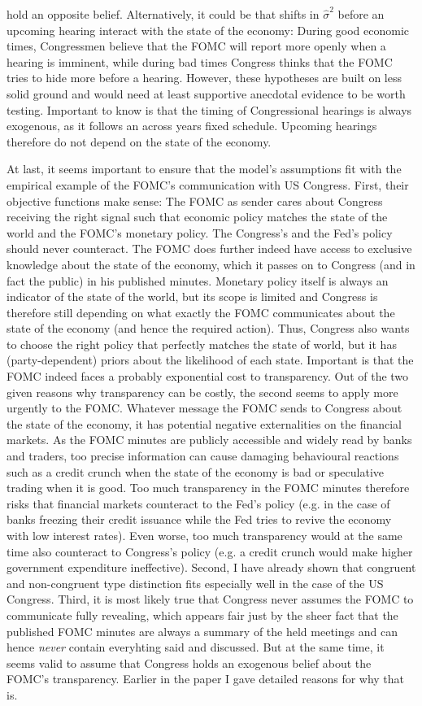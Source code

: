 \documentclass[paper=a4,12pt,DIV=11,twoside=false]{scrartcl}
\begin{document}
hold an opposite belief. Alternatively, it could be that shifts in $\hat{\sigma}^2$ before an upcoming hearing interact with the state of the economy: During good economic times, Congressmen believe that the FOMC will report more openly when a hearing is imminent, while during bad times Congress thinks that the FOMC tries to hide more before a hearing. However, these hypotheses are built on less solid ground and would need at least supportive anecdotal evidence to be worth testing. Important to know is that the timing of Congressional hearings is always exogenous, as it follows an across years fixed schedule. Upcoming hearings therefore do not depend on the state of the economy. 

\noindent At last, it seems important to ensure that the model's assumptions fit with the empirical example of the FOMC's communication with US Congress. First, their objective functions make sense: The FOMC as sender cares about Congress receiving the right signal such that economic policy matches the state of the world and the FOMC's monetary policy. The Congress's and the Fed's policy should never counteract. The FOMC does further indeed have access to exclusive knowledge about the state of the economy, which it passes on to Congress (and in fact the public) in his published minutes. Monetary policy itself is always an indicator of the state of the world, but its scope is limited and Congress is therefore still depending on what exactly the FOMC communicates about the state of the economy (and hence the required action). Thus, Congress also wants to choose the right policy that perfectly matches the state of world, but it has (party-dependent) priors about the likelihood of each state. Important is that the FOMC indeed faces a probably exponential cost to transparency. Out of the two given reasons why transparency can be costly, the second seems to apply more urgently to the FOMC. Whatever message the FOMC sends to Congress about the state of the economy, it has potential negative externalities on the financial markets. As the FOMC minutes are publicly accessible and widely read by banks and traders, too precise information can cause damaging behavioural reactions such as a credit crunch when the state of the economy is bad or speculative trading when it is good. Too much transparency in the FOMC minutes therefore risks that financial markets counteract to the Fed's policy (e.g. in the case of banks freezing their credit issuance while the Fed tries to revive the economy with low interest rates). Even worse, too much transparency would at the same time also counteract to Congress's policy (e.g. a credit crunch would make higher government expenditure ineffective). Second, I have already shown that congruent and non-congruent type distinction fits especially well in the case of the US Congress. Third,   it is most likely true that Congress never assumes the FOMC to communicate fully revealing, which appears fair just by the sheer fact that the published FOMC minutes are always a summary of the held meetings and can hence \textit{never} contain everyhting said and discussed. But at the same time, it seems valid to assume that Congress holds an exogenous belief about the FOMC's transparency. Earlier in the paper I gave detailed reasons for why that is. 
\end{document}
